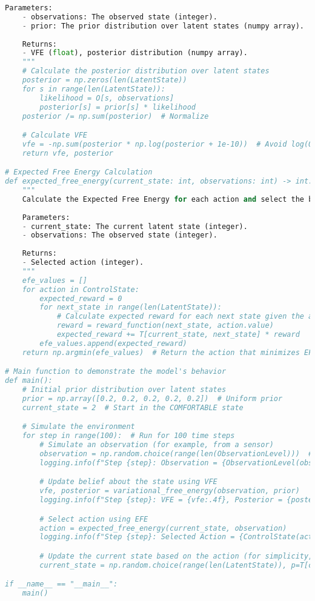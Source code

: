 \documentclass[11pt,a4paper]{article}
\begin{document}
\begin{lstlisting}[language=Python, caption={Full implementation code}]
    Parameters:
    - observations: The observed state (integer).
    - prior: The prior distribution over latent states (numpy array).
    
    Returns:
    - VFE (float), posterior distribution (numpy array).
    """
    # Calculate the posterior distribution over latent states
    posterior = np.zeros(len(LatentState))
    for s in range(len(LatentState)):
        likelihood = O[s, observations]
        posterior[s] = prior[s] * likelihood
    posterior /= np.sum(posterior)  # Normalize

    # Calculate VFE
    vfe = -np.sum(posterior * np.log(posterior + 1e-10))  # Avoid log(0)
    return vfe, posterior

# Expected Free Energy Calculation
def expected_free_energy(current_state: int, observations: int) -> int:
    """
    Calculate the Expected Free Energy for each action and select the best action.
    
    Parameters:
    - current_state: The current latent state (integer).
    - observations: The observed state (integer).
    
    Returns:
    - Selected action (integer).
    """
    efe_values = []
    for action in ControlState:
        expected_reward = 0
        for next_state in range(len(LatentState)):
            # Calculate expected reward for each next state given the action
            reward = reward_function(next_state, action.value)
            expected_reward += T[current_state, next_state] * reward
        efe_values.append(expected_reward)
    return np.argmin(efe_values)  # Return the action that minimizes EFE

# Main function to demonstrate the model's behavior
def main():
    # Initial prior distribution over latent states
    prior = np.array([0.2, 0.2, 0.2, 0.2, 0.2])  # Uniform prior
    current_state = 2  # Start in the COMFORTABLE state

    # Simulate the environment
    for step in range(100):  # Run for 100 time steps
        # Simulate an observation (for example, from a sensor)
        observation = np.random.choice(range(len(ObservationLevel)))  # Random observation
        logging.info(f"Step {step}: Observation = {ObservationLevel(observation).name}")

        # Update belief about the state using VFE
        vfe, posterior = variational_free_energy(observation, prior)
        logging.info(f"Step {step}: VFE = {vfe:.4f}, Posterior = {posterior}")

        # Select action using EFE
        action = expected_free_energy(current_state, observation)
        logging.info(f"Step {step}: Selected Action = {ControlState(action).name}")

        # Update the current state based on the action (for simplicity, assume deterministic)
        current_state = np.random.choice(range(len(LatentState)), p=T[current_state])

if __name__ == "__main__":
    main()
\end{lstlisting}
\end{document}
